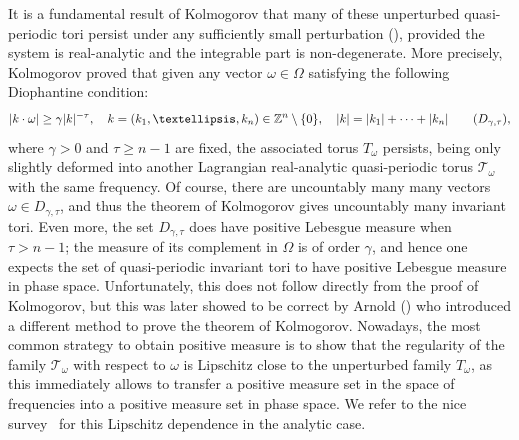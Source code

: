 \documentclass[11pt]{article}
\let\mathcal\mathscr
\numberwithin{equation}{section}
\theoremstyle{plain}
\theoremstyle{definition}
\newcommand{\Z}{\mathbb{Z}}
\begin{document}
It is a fundamental result of Kolmogorov that many of these unperturbed quasi-periodic tori persist under any sufficiently small perturbation (\cite{Kol54}), provided the system is real-analytic and the integrable part is non-degenerate. More precisely, Kolmogorov proved that given any vector $\omega \in \Omega$ satisfying the following Diophantine condition:
\begin{equation}\label{dioph}
|k\cdot \omega| \geq \gamma |k|^{-\tau}, \quad k=(k_1,\dots,k_n) \in \Z^n\setminus\{0\}, \quad |k|=|k_1|+\cdots+|k_n| \tag{$D_{\gamma,\tau}$},
\end{equation}
where $\gamma>0$ and $\tau \geq n-1$ are fixed, the associated torus $T_{\omega}$ persists, being only slightly deformed into another Lagrangian real-analytic quasi-periodic torus $\mathcal{T}_\omega$ with the same frequency. Of course, there are uncountably many many vectors $\omega \in D_{\gamma,\tau}$, and thus the theorem of Kolmogorov gives uncountably many invariant tori. Even more, the set $D_{\gamma,\tau}$ does have positive Lebesgue measure when $\tau>n-1$; the measure of its complement in $\Omega$ is of order $\gamma$, and hence one expects the set of quasi-periodic invariant tori to have positive Lebesgue measure in phase space. Unfortunately, this does not follow directly from the proof of Kolmogorov, but this was later showed to be correct by Arnold (\cite{Arn63a}) who introduced a different method to prove the theorem of Kolmogorov. Nowadays, the most common strategy to obtain positive measure is to show that the regularity of the family $\mathcal{T}_\omega$ with respect to $\omega$ is Lipschitz close to the unperturbed family $T_\omega$, as this immediately allows to transfer a positive measure set in the space of frequencies into a positive measure set in phase space. We refer to the nice survey~\cite{Pos01} for this Lipschitz dependence in the analytic case.
\end{document}
